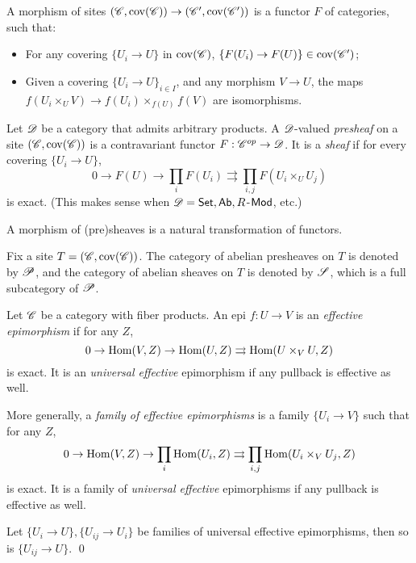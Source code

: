 \documentclass[11pt]{amsart}
\begin{document}
\begin{defn}
    A morphism of sites $(\mathscr{C}, \operatorname{cov}(\mathscr{C})) \to (\mathscr{C}', \operatorname{cov}(\mathscr{C}'))$ is a functor $F$ of categories, such that:
    \begin{itemize}
        \item For any covering $\{U_i\to U\}$ in $\operatorname{cov}(\mathscr{C})$, $\{F(U_i)\to F(U)\} \in \operatorname{cov}(\mathscr{C}')$;
        \item Given a covering $\{U_i\to U\}_{i\in I}$, and any morphism $V\to U$, the maps $f(U_i\times_U V) \to f(U_i) \times_{f(U)} f(V)$ are isomorphisms.
    \end{itemize}
\end{defn}




\begin{defn}
    Let $\mathscr{D}$ be a category that admits arbitrary products. A $\mathscr{D}$-valued \emph{presheaf} on a site $(\mathscr{C}, \operatorname{cov}(\mathscr{C}))$ is a contravariant functor $F: \mathscr{C}^{op}\to \mathscr{D}$. It is a \emph{sheaf} if for every covering $\{U_i\to U\}$,
    \[0\to F(U)\to \prod_i F(U_i) \rightrightarrows \prod_{i,j} F(U_i\times_U U_j)\]
    is exact. (This makes sense when $\mathscr{D} = \mathsf{Set}, \mathsf{Ab}, R$-$\mathsf{Mod}$, etc.)

    A morphism of (pre)sheaves is a natural transformation of functors.
\end{defn}


Fix a site $T = (\mathscr{C}, \operatorname{cov}(\mathscr{C}))$. The category of abelian presheaves on $T$ is denoted by $\mathscr{P}$, and the category of abelian sheaves on $T$ is denoted by $\mathscr{S}$, which is a full subcategory of $\mathscr{P}$.



\begin{defn}
    Let $\mathscr{C}$ be a category with fiber products. An epi $f:U\to V$ is an \emph{effective epimorphism} if for any $Z$, 
    \[0\to \operatorname{Hom}(V,Z)\to \operatorname{Hom}(U,Z) \rightrightarrows \operatorname{Hom}(U\times_V U, Z)\]
    is exact. It is an \emph{universal effective} epimorphism if any pullback is effective as well.

    More generally, a \emph{family of effective epimorphisms} is a family $\{U_i\to V\}$ such that for any $Z$, 
    \[0\to \operatorname{Hom}(V,Z)\to \prod_i \operatorname{Hom}(U_i, Z) \rightrightarrows \prod_{i,j}\operatorname{Hom}(U_i\times_V U_j, Z)\]
    is exact. It is a family of \emph{universal effective} epimorphisms if any pullback is effective as well.
\end{defn}

\begin{prop}
    Let $\{U_i\to U\},\{U_{ij}\to U_i\}$ be families of universal effective epimorphisms, then so is $\{U_{ij}\to U\}$. \qed
\end{prop}
\end{document}
